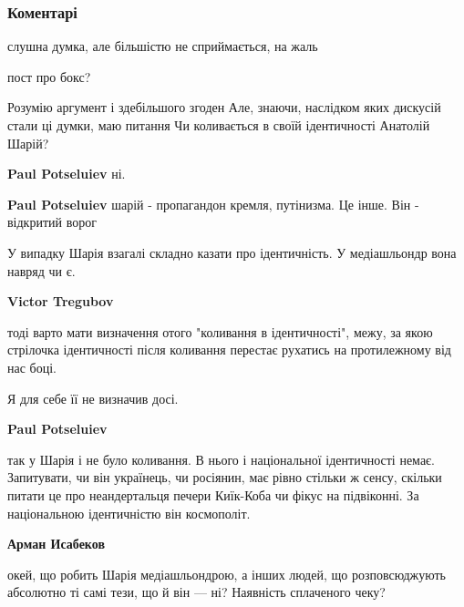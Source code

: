  
 
 
 
 
\subsubsection{Коментарі}
\label{sec:26_09_2021.fb.tregubov_viktor.1.identichnost_model.cmt}

\begin{itemize} %
слушна думка, але більшістю не сприймається, на жаль

пост про бокс?

Розумію аргумент і здебільшого згоден
Але, знаючи, наслідком яких дискусій стали ці думки, маю питання
Чи коливається в своїй ідентичності Анатолій Шарій?

\begin{itemize} %
\textbf{Paul Potseluiev} ні.

\textbf{Paul Potseluiev} шарій - пропагандон кремля, путінизма. Це інше. Він - відкритий ворог

У випадку Шарія взагалі складно казати про ідентичність. У медіашльондр вона навряд чи є.

\textbf{Victor Tregubov} 

тоді варто мати визначення отого "коливання в ідентичності", межу, за якою
стрілочка ідентичності після коливання перестає рухатись на протилежному від
нас боці.

Я для себе її не визначив досі.


\textbf{Paul Potseluiev} 

так у Шарія і не було коливання. В нього і національної ідентичності немає.
Запитувати, чи він українець, чи росіянин, має рівно стільки ж сенсу, скільки
питати це про неандертальця печери Киїк-Коба чи фікус на підвіконні. За
національною ідентичністю він космополіт.


\textbf{Арман Исабеков} 

окей, що робить Шарія медіашльондрою, а інших людей, що розповсюджують
абсолютно ті самі тези, що й він — ні? Наявність сплаченого чеку?


\end{itemize}
\end{itemize}
